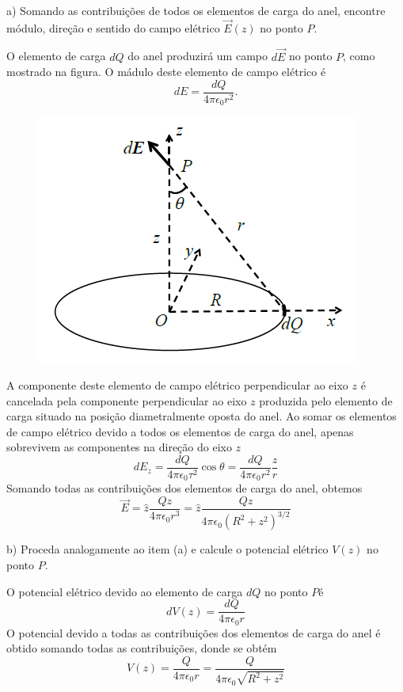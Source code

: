 \begin{enumerate}[start=1,label={\bfseries Q\arabic*.}]
a) Somando as contribuições de todos os elementos de carga do anel, encontre módulo, direção e sentido do campo elétrico $\vec{E}(z)$ no ponto $P$.

\resposta O elemento de carga $d Q$ do anel produzirá um campo $d \vec{E}$ no ponto $P$, como mostrado na figura. O mádulo deste elemento de campo elétrico é
$$
d E = \frac{d Q}{4 \pi \epsilon_{0} r^{2}}.
$$
\begin{figure}[H]
  \centering
  \includegraphics[scale=0.7]{eletromag-img/anel3.png}
\end{figure}
A componente deste elemento de campo elétrico perpendicular ao eixo $z$ é cancelada pela componente perpendicular ao eixo $z$ produzida pelo elemento de carga situado na posição diametralmente oposta do anel. Ao somar os elementos de campo elétrico devido a todos os elementos de carga do anel, apenas sobrevivem as componentes na direção do eixo $z$
$$
d E_{z}=\frac{d Q}{4 \pi \epsilon_{0} \tau^{2}} \cos \theta=\frac{d Q}{4 \pi \epsilon_{0} r^{2}} \frac{z}{r}
$$
Somando todas as contribuições dos elementos de carga do anel, obtemos
$$
\vec{E}=\hat{z} \frac{Q z}{4 \pi \epsilon_{0} r^{3}}=\hat{z} \frac{Q z}{4 \pi \epsilon_{0}\left(R^{2}+z^{2}\right)^{3 / 2}}
$$


b) Proceda analogamente ao item (a) e calcule o potencial elétrico $V (z)$ no ponto $P$.

\resposta O potencial elétrico devido ao elemento de carga $d Q$ no ponto $P é$
$$
d V(z)=\frac{d Q}{4 \pi \epsilon_{0} r}
$$
O potencial devido a todas as contribuições dos elementos de carga do anel é obtido somando todas as contribuições, donde se obtém
$$
V(z)=\frac{Q}{4 \pi \epsilon_{0} r}=\frac{Q}{4 \pi \epsilon_{0} \sqrt{R^{2}+z^{2}}}
$$



\end{enumerate}
